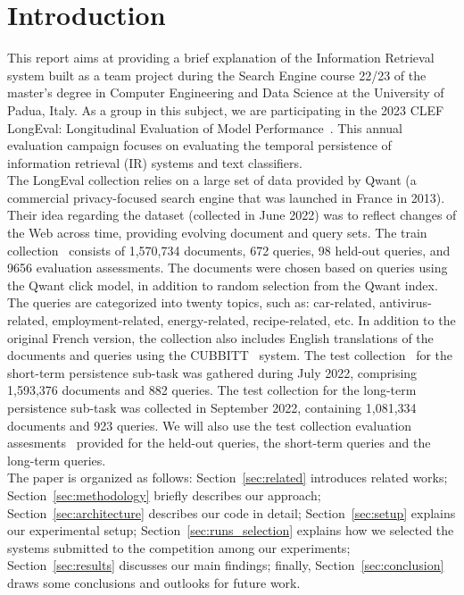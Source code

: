 \section{Introduction}
\label{sec:introduction}

This report aims at providing a brief explanation of the Information Retrieval system built as a team project during the
Search Engine course 22/23 of the master's degree in Computer Engineering and Data Science at the University of Padua,
Italy.
As a group in this subject, we are participating in the 2023 CLEF LongEval: Longitudinal Evaluation of Model
Performance~\cite{LongEval}.
This annual evaluation campaign focuses on evaluating the temporal persistence of information retrieval (IR) systems and
text classifiers.\\

The LongEval collection relies on a large set of data provided by Qwant (a commercial privacy-focused
search engine that was launched in France in 2013).
Their idea regarding the dataset (collected in June 2022) was to reflect changes of the Web across time, providing
evolving document and query sets.
The train collection~\cite{traindata} consists of 1,570,734 documents, 672 queries, 98 held-out queries, and 9656
evaluation assessments.
The documents were chosen based on queries using the Qwant click model, in addition to random selection from the Qwant
index.
The queries are categorized into twenty topics, such as: car-related, antivirus-related, employment-related,
energy-related, recipe-related, etc.
In addition to the original French version, the collection also includes English translations of the documents and
queries using the CUBBITT~\cite{CUBBITT} system.
The test collection~\cite{testdata} for the short-term persistence sub-task was gathered during July 2022, comprising
1,593,376 documents and 882 queries.
The test collection for the long-term persistence sub-task was collected in September 2022, containing 1,081,334
documents and 923 queries.
We will also use the test collection evaluation assesments~\cite{test_qrels} provided for the held-out queries, the
short-term queries and the long-term queries.\\

The paper is organized as follows: Section~\ref{sec:related} introduces related works;
Section~\ref{sec:methodology} briefly describes our approach;
Section~\ref{sec:architecture} describes our code in detail;
Section~\ref{sec:setup} explains our experimental setup;
Section~\ref{sec:runs_selection} explains how we selected the systems submitted to the competition among our
experiments;
Section~\ref{sec:results} discusses our main findings;
finally, Section~\ref{sec:conclusion} draws some conclusions and outlooks for future work.